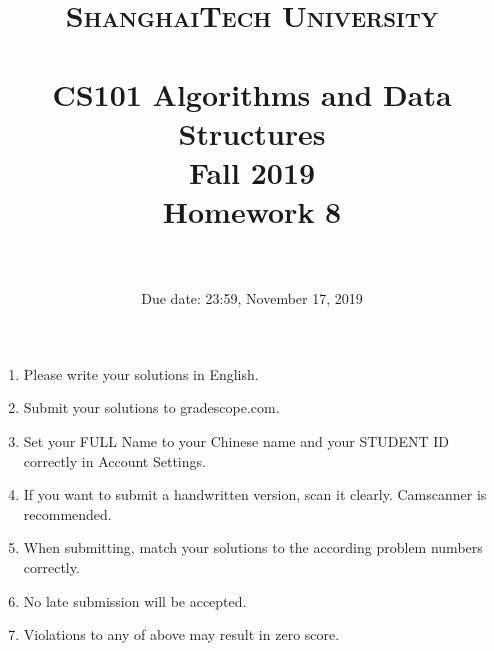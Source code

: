 \documentclass[10.5pt]{article}
\title{
	\normalfont \normalsize
	\textsc{ShanghaiTech University} \\ [25pt]
	\horrule{0.5pt} \\[0.4cm] %
	\huge CS101 Algorithms and Data Structures\\ %
	\LARGE Fall 2019\\
	\LARGE Homework 8\\
	\horrule{2pt} \\[0.5cm] %
}
\author{}
\date{Due date: 23:59, November 17, 2019}
\begin{document}
	\maketitle
	\thispagestyle{firstpage}
	\vspace{3ex}
	
	\begin{enumerate}
		\item Please write your solutions in English. 
		
		\item Submit your solutions to gradescope.com.  
		
		\item Set your FULL Name to your Chinese name and your STUDENT ID correctly in Account Settings. 
		
		\item If you want to submit a handwritten version, scan it clearly. Camscanner is recommended. 
		
		\item When submitting, match your solutions to the according problem numbers correctly. 
		
		\item No late submission will be accepted.
		
		\item Violations to any of above may result in zero score. 
	\end{enumerate}
	\newpage
	
\end{document}
